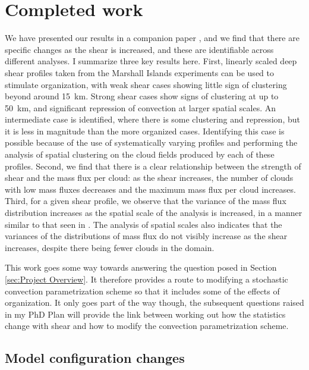 \documentclass[11pt,a4paper]{article}
\newcommand\todo[1]{\textbf{TODO: #1}}
\begin{document}

\section{Completed work}

We have presented our results in a companion paper \parencite{muetz2017effects}, and we find that there are specific changes as the shear is increased, and these are identifiable across different analyses. I summarize three key results here. First, linearly scaled deep shear profiles taken from the Marshall Islands experiments \parencite{yanai1973determination} can be used to stimulate organization, with weak shear cases showing little sign of clustering beyond around \SI{15}{km}. Strong shear cases show signs of clustering at up to \SI{50}{km}, and significant repression of convection at larger spatial scales. An intermediate case is identified, where there is some clustering and repression, but it is less in magnitude than the more organized cases. Identifying this case is possible because of the use of systematically varying profiles and performing the analysis of spatial clustering on the cloud fields produced by each of these profiles. Second, we find that there is a clear relationship between the strength of shear and the mass flux per cloud: as the shear increases, the number of clouds with low mass fluxes decreases and the maximum mass flux per cloud increases. Third, for a given shear profile, we observe that the variance of the mass flux distribution increases as the spatial scale of the analysis is increased, in a manner similar to that seen in \cite{plant2008stochastic}. The analysis of spatial scales also indicates that the variances of the distributions of mass flux do not visibly increase as the shear increases, despite there being fewer clouds in the domain.

This work goes some way towards answering the question posed in Section \ref{sec:Project Overview}. It therefore provides a route to modifying a stochastic convection parametrization scheme so that it includes some of the effects of organization. It only goes part of the way though, the subsequent questions raised in my PhD Plan will provide the link between working out how the statistics change with shear and how to modify the convection parametrization scheme. 

\subsection{Model configuration changes}
\label{sec:modelling_config}
\end{document}
